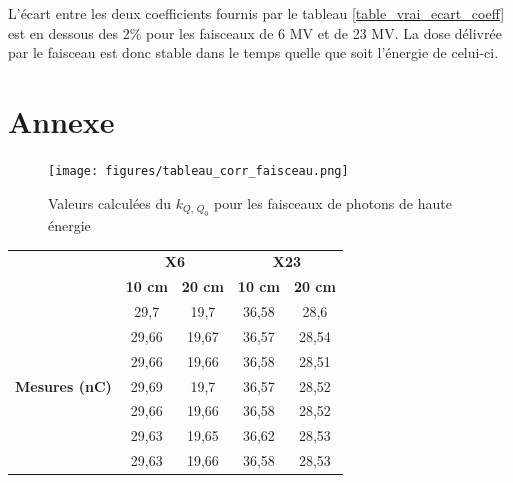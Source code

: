 \documentclass{article}
\begin{document}
L'écart entre les deux coefficients fournis par le tableau \ref*{table_vrai_ecart_coeff} est en dessous des 2\% pour les faisceaux de 6 MV et de 23 MV. La dose délivrée par le faisceau est donc stable dans le temps quelle que soit l'énergie de celui-ci.

\clearpage
\section{Annexe}

\begin{figure}[h]
  \centering
  \texttt{[image: figures/tableau\_corr\_faisceau.png]}
  \caption{Valeurs calculées du $k_{Q,\, Q_0}$ pour les faisceaux de photons de haute énergie}
  \label{fig_table_kQQ0}
\end{figure}

\begin{table}[h]
  \centering
  \begin{tabular}{c|cc|cc|}
  \cline{2-5}
                                                                & \multicolumn{2}{c|}{\textbf{X6}} & \multicolumn{2}{c|}{\textbf{X23}} \\ \cline{2-5} 
  \textbf{}                                                     & \textbf{10 cm}  & \textbf{20 cm} & \textbf{10 cm}  & \textbf{20 cm}  \\ \hline
  \multicolumn{1}{|c|}{\multirow{10}{*}{\textbf{Mesures (nC)}}} & 29,7            & 19,7           & 36,58           & 28,6            \\
  \multicolumn{1}{|c|}{}                                        & 29,66           & 19,67          & 36,57           & 28,54           \\
  \multicolumn{1}{|c|}{}                                        & 29,66           & 19,66          & 36,58           & 28,51           \\
  \multicolumn{1}{|c|}{}                                        & 29,69           & 19,7           & 36,57           & 28,52           \\
  \multicolumn{1}{|c|}{}                                        & 29,66           & 19,66          & 36,58           & 28,52           \\
  \multicolumn{1}{|c|}{}                                        & 29,63           & 19,65          & 36,62           & 28,53           \\
  \multicolumn{1}{|c|}{}                                        & 29,63           & 19,66          & 36,58           & 28,53           \\

\end{tabular}
\end{table}
\end{document}
